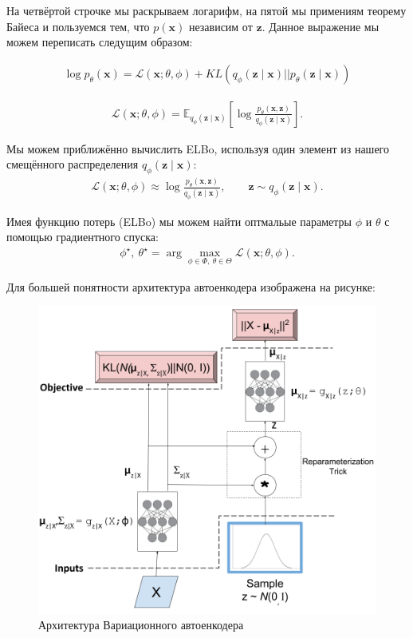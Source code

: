 \documentclass[a4paper]{report}
\begin{document}
На четвёртой строчке мы раскрываем логарифм, на пятой мы примениям теорему Байеса и пользуемся тем, что $p(\mathbf{x})$ независим от $\mathbf{z}$. Данное
выражение мы можем переписать следущим образом:

\begin{align*}
  \log p_\theta(\mathbf{x}) = \mathcal{L} (\mathbf{x}; \theta, \phi) + KL \left( q_\phi (\mathbf{z} \mid \mathbf{x}) || p_\theta(\mathbf{z} \mid \mathbf{x}) \right)
\end{align*}

\begin{align*}
  \mathcal{L} (\mathbf{x}; \theta, \phi) = \mathbb{E}_{q_\phi (\mathbf{z} \mid \mathbf{x})}
    \left[
      \log \frac{
        p_\theta (\mathbf{x}, \mathbf{z})
      }{
        q_\phi (\mathbf{z} \mid \mathbf{x})
      }
    \right].
\end{align*}

Мы можем приближённо вычислить ELBo, используя один элемент из нашего смещённого распределения $q_\phi(\mathbf{z} \mid \mathbf{x})$:
\begin{align*}
   \mathcal{L} (\mathbf{x}; \theta, \phi) \approx  \log \frac{
      p_\theta (\mathbf{x}, \mathbf{z})
    }{
      q_\phi (\mathbf{z} \mid \mathbf{x})
    }, \qquad \mathbf{z} \sim q_\phi (\mathbf{z} \mid \mathbf{x}). 
\end{align*}

Имея функцию потерь (ELBo) мы можем найти оптмальые параметры $\phi$ и $\theta$ с помощью градиентного спуска:
\begin{align*}
  \phi^\star,~\theta^\star = \arg \max_{\phi \in \Phi,~\theta \in \Theta}
  \mathcal{L} (\mathbf{x}; \theta, \phi).  
\end{align*}

Для большей понятности архитектура автоенкодера изображена на рисунке:
\begin{figure}[H]
  \includegraphics[width=\linewidth]{vae.png}
  \caption{Архитектура Вариационного автоенкодера}
  \label{fig:vae}
\end{figure}
\end{document}

